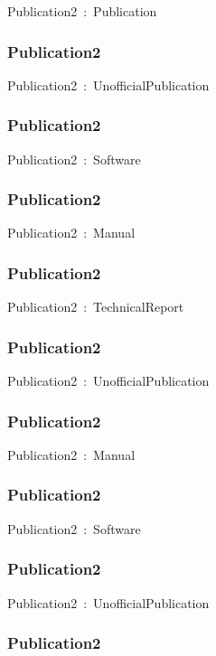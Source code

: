 \documentclass{article}
\begin{document}
Publication2~:~Publication

\subsubsection*{Publication2}

Publication2~:~UnofficialPublication

\subsubsection*{Publication2}

Publication2~:~Software

\subsubsection*{Publication2}

Publication2~:~Manual

\subsubsection*{Publication2}

Publication2~:~TechnicalReport

\subsubsection*{Publication2}

Publication2~:~UnofficialPublication

\subsubsection*{Publication2}

Publication2~:~Manual

\subsubsection*{Publication2}

Publication2~:~Software

\subsubsection*{Publication2}

Publication2~:~UnofficialPublication

\subsubsection*{Publication2}
\end{document}
